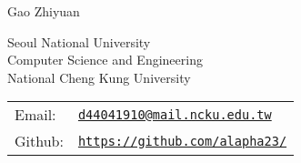 \documentclass[letterpaper]{article}
\def\name{Gao Zhiyuan}
\renewenvironment{itemize}{
  \begin{list}{}{
    \setlength{\leftmargin}{1.5em}
  }
}{
  \end{list}
}
\begin{document}
{\huge \name}


\vspace{0.25in}

\begin{minipage}{0.45\linewidth}
  Seoul National University \\
  Computer Science and Engineering \\
	National Cheng Kung University \\
\end{minipage}
\begin{minipage}{0.45\linewidth}
  \begin{tabular}{ll}
    Email: & \href{mailto:d44041910@mail.ncku.edu.tw}{\tt d44041910@mail.ncku.edu.tw} \\
    Github: & \href{https://github.com/alapha23/}{\tt https://github.com/alapha23/} \\
  \end{tabular}
\end{minipage}


%

\end{document}
